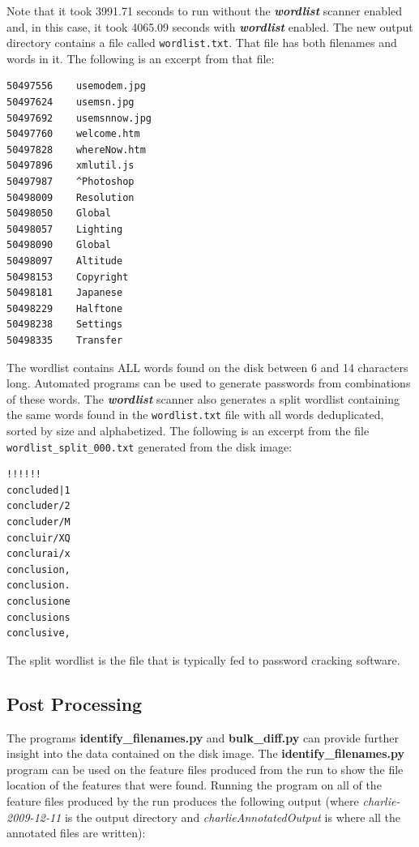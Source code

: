 Note that it took 3991.71 seconds to run \bulk without the \textbf{\textit{wordlist}} scanner enabled and, in this case, it took 4065.09 seconds with \textbf{\textit{wordlist}} enabled.  The new output directory contains a file called \texttt{wordlist.txt}. That file has both filenames and words in it. The following is an excerpt from that file:
\lstset{style=customfile}
\begin{lstlisting}
50497556	usemodem.jpg
50497624	usemsn.jpg
50497692	usemsnnow.jpg
50497760	welcome.htm
50497828	whereNow.htm
50497896	xmlutil.js
50497987	^Photoshop
50498009	Resolution
50498050	Global
50498057	Lighting
50498090	Global
50498097	Altitude
50498153	Copyright
50498181	Japanese
50498229	Halftone
50498238	Settings
50498335	Transfer
\end{lstlisting}
The wordlist contains ALL words found on the disk between 6 and 14 characters long. Automated programs can be used to generate passwords from combinations of these words. The \textbf{\textit{wordlist}} scanner also generates a split wordlist containing the same words found in the \texttt{wordlist.txt} file with all words deduplicated, sorted by size and alphabetized. The following is an excerpt from the file \texttt{wordlist\_split\_000.txt} generated from the disk image:
\lstset{style=customfile}
\begin{lstlisting}!!!!!!
concluded|1
concluder/2
concluder/M
concluir/XQ
conclurai/x
conclusion,
conclusion.
conclusione
conclusions
conclusive,
\end{lstlisting}
The split wordlist is the file that is typically fed to password cracking software.

\subsection{Post Processing}
The programs \textbf{identify\_filenames.py} and \textbf{bulk\_diff.py} can provide further insight into the data contained on the disk image. The \textbf{identify\_filenames.py} program can be used on the feature files produced from the \bulk run to show the file location of the features that were found. Running the program on all of the feature files produced by the \bulk run produces the following output (where \textit{charlie-2009-12-11} is the \bulk output directory and \textit{charlieAnnotatedOutput} is where all the annotated files are written):\\


